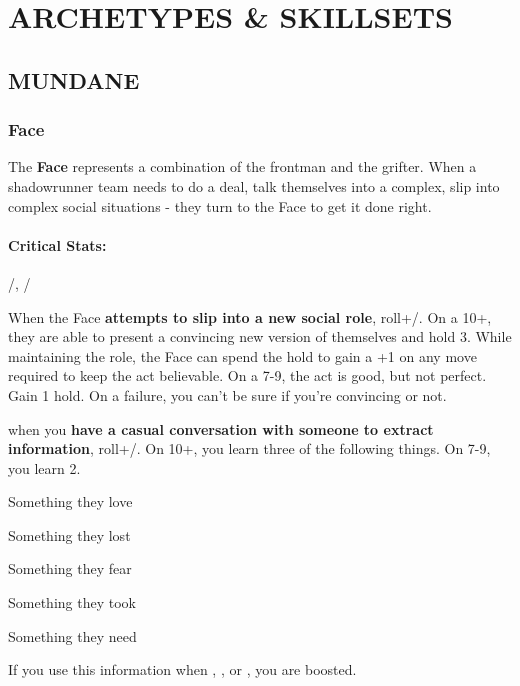 \documentclass[oneside,10pt]{article}
\begin{document}
\newpage
{}
\section{ARCHETYPES \& SKILLSETS}
\label{archetypes}
\begin{multicols}{2}

\subsection{MUNDANE}

\subsubsection{Face}
The \textbf{Face} represents a combination of the frontman and the
grifter. When a shadowrunner team needs to do a deal, talk themselves
into a complex, slip into complex social situations -  they turn to
the Face to get it done right.

\paragraph{Critical Stats:}
\flair/, \mastery/

\begin{tcolorbox}[title=Special Move]
 When the Face \textbf{attempts to slip into a new social role},
roll+\flair/. On a 10+, they are able to present a convincing new
version of themselves and hold 3. While maintaining the role, the Face
can spend the hold to gain a +1 on any move required to keep the act
believable. On a 7-9, the act is good, but not perfect. Gain 1
hold. On a failure, you can't be sure if you're convincing or not.
\end{tcolorbox}


 when you \textbf{have a casual conversation
  with someone to extract information}, roll+\mastery/. On 10+, you
learn three of the following things. On 7-9, you learn 2.
\begin{dent}
  \tcirc{} Something they love
  
  \tcirc{} Something they lost
  
  \tcirc{} Something they fear
  
  \tcirc{} Something they took
  
  \tcirc{} Something they need
\end{dent}
If you use this information when ,
, or , you are
boosted.


\end{multicols}
\end{document}
